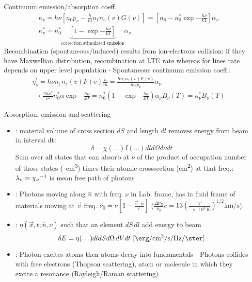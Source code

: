 \begin{frame}{Continuum emission/absorption coeff.}
    \begin{align*}
        &\kappa_{\nu}=h\nu[n_0p_{\nu}-\frac{h}{m}n_1n_e(v)G(v)]=[n_0-n_0^*\exp{-\frac{h\nu}{kT}}]\alpha_{\nu}\\
        &\kappa_{\nu}^*=n_0^*\underbrace{[1-\exp{-\frac{h\nu}{kT}}]}_{\text{correction stimulated emission}}\alpha_{\nu}\tag{LTE}
    \end{align*}
    Recombination (spontaneous/induced) results from ion-electrons collision: if they have Maxwellian distribution, recombination at LTE rate whereas for lines rate depends on upper level population - Spontaneous continuum emission coeff.:
\begin{align*}
    &\eta_{\nu}^t=h\nu n_1n_e(v)F(v)\frac{h}{m}=\frac{hn_1n_e(v)F(v)}{m_ep_{\nu}}\alpha_{\nu}\\
    &\to\frac{2h\nu^3}{c^2}n_0^*\alpha\exp{-\frac{h\nu}{kT}}=n_0^*(1-\exp{-\frac{h\nu}{kT}})\alpha_{\nu}B_{\nu}(T)=\kappa_{\nu}^*B_{\nu}(T)
\end{align*}
\end{frame}

\begin{frame}{Absorption, emission and scattering}
    \begin{itemize}
        \item {}: material volume of cross section $dS$ and length $dl$ removes energy from beam in interval dt:
            \[\delta=\chi(\ldots)I(\ldots)dld\Omega d\nu dt\]
            Sum over all states that can absorb at $\nu$ of the product of occupation number of those states (\si{\per\cubic\cm}) times their atomic crosssection (\si{\square\cm}) at that freq.: $\lambda_{\nu}={\chi_{\nu}}^{-1}$ is mean free path of photons
        \item {}: Photons moving along $\hat{n}$ with freq. $\nu$ in Lab. frame, has in fluid frame of materials moving at $\vec{v}$ freq. $\nu_0=\nu[1-\frac{\vec{v}\cdot\hat{n}}{c}]$ ($\frac{\Delta\nu_D}{\nu_0}c=13(\frac{T}{\SI{e4}{\kelvin}})^{1/2}\si{\kilo\meter\per\second}$).
        \item {}: $\eta(\vec{x},t;\hat{n},\nu)$ such that an element $dS\,dl$ add energy to beam
            \[\delta E=\eta(\ldots)dldSd\Omega\,dVdt\ [\si{\erg\per\cubic\cm\per\second\per\hertz\per\ster}]\]
        \item {}: Photon excites atoms then atoms decay into fundamentals - Photons collides with free electrons (Thopson scattering), atom or molecule in which they excite a resonance (Rayleigh/Raman scattering) 
    \end{itemize}
\end{frame}

